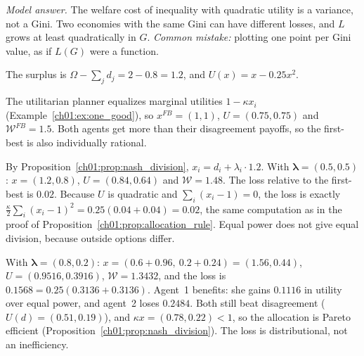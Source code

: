 \documentclass[../solutions_manual.tex]{subfiles}
\begin{document}
\begin{center}
\end{center}

\emph{Model answer.} The welfare cost of inequality with quadratic utility is a variance, not a Gini. Two economies with the same Gini can have different losses, and $L$ grows at least quadratically in $G$. \emph{Common mistake:} plotting one point per Gini value, as if $L(G)$ were a function.


The surplus is $\Omega - \sum_j d_j = 2 - 0.8 = 1.2$, and $U(x) = x - 0.25x^2$.

 The utilitarian planner equalizes marginal utilities $1 - \kappa x_i$ (Example~\ref{ch01:ex:one_good}), so $x^{FB} = (1, 1)$, $U = (0.75, 0.75)$ and $\mathcal{W}^{FB} = 1.5$. Both agents get more than their disagreement payoffs, so the first-best is also individually rational.

 By Proposition~\ref{ch01:prop:nash_division}, $x_i = d_i + \lambda_i\cdot 1.2$. With $\boldsymbol\lambda = (0.5, 0.5)$: $x = (1.2, 0.8)$, $U = (0.84, 0.64)$ and $\mathcal{W} = 1.48$. The loss relative to the first-best is $0.02$. Because $U$ is quadratic and $\sum_i(x_i - 1) = 0$, the loss is exactly $\frac{\kappa}{2}\sum_i(x_i - 1)^2 = 0.25(0.04 + 0.04) = 0.02$, the same computation as in the proof of Proposition~\ref{ch01:prop:allocation_rule}. Equal power does not give equal division, because outside options differ.

 With $\boldsymbol\lambda = (0.8, 0.2)$: $x = (0.6 + 0.96,\ 0.2 + 0.24) = (1.56, 0.44)$, $U = (0.9516, 0.3916)$, $\mathcal{W} = 1.3432$, and the loss is $0.1568 = 0.25(0.3136 + 0.3136)$. Agent~1 benefits: she gains $0.1116$ in utility over equal power, and agent~2 loses $0.2484$. Both still beat disagreement ($U(d) = (0.51, 0.19)$), and $\kappa x = (0.78, 0.22) < 1$, so the allocation is Pareto efficient (Proposition~\ref{ch01:prop:nash_division}). The loss is distributional, not an inefficiency.
\end{document}
